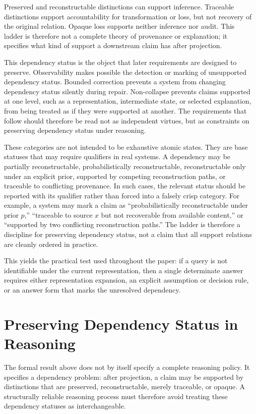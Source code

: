 \documentclass[11pt]{article}
\begin{document}
Preserved and reconstructable distinctions can support inference. Traceable distinctions support accountability for transformation or loss, but not recovery of the original relation. Opaque loss supports neither inference nor audit. This ladder is therefore not a complete theory of provenance or explanation; it specifies what kind of support a downstream claim has after projection.

This dependency status is the object that later requirements are designed to preserve. Observability makes possible the detection or marking of unsupported dependency status. Bounded correction prevents a system from changing dependency status silently during repair. Non-collapse prevents claims supported at one level, such as a representation, intermediate state, or selected explanation, from being treated as if they were supported at another. The requirements that follow should therefore be read not as independent virtues, but as constraints on preserving dependency status under reasoning.

These categories are not intended to be exhaustive atomic states. They are base statuses that may require qualifiers in real systems. A dependency may be partially reconstructable, probabilistically reconstructable, reconstructable only under an explicit prior, supported by competing reconstruction paths, or traceable to conflicting provenance. In such cases, the relevant status should be reported with its qualifier rather than forced into a falsely crisp category. For example, a system may mark a claim as ``probabilistically reconstructable under prior $p$,'' ``traceable to source $x$ but not recoverable from available content,'' or ``supported by two conflicting reconstruction paths.'' The ladder is therefore a discipline for preserving dependency status, not a claim that all support relations are cleanly ordered in practice.

This yields the practical test used throughout the paper: if a query is not identifiable under the current representation, then a single determinate answer requires either representation expansion, an explicit assumption or decision rule, or an answer form that marks the unresolved dependency.

\section{Preserving Dependency Status in Reasoning}

The formal result above does not by itself specify a complete reasoning policy. It specifies a dependency problem: after projection, a claim may be supported by distinctions that are preserved, reconstructable, merely traceable, or opaque. A structurally reliable reasoning process must therefore avoid treating these dependency statuses as interchangeable.
\end{document}
